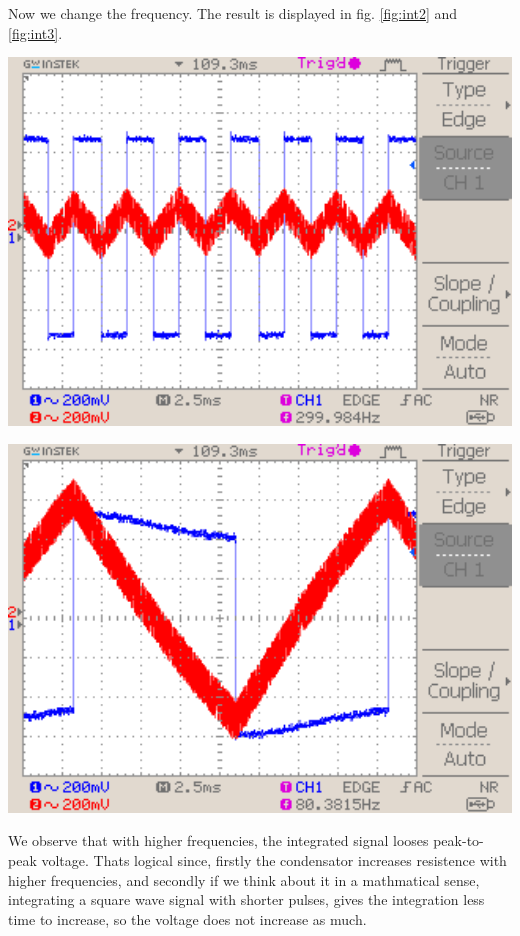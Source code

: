 \documentclass[a4paper,10pt]{article}
\newenvironment{Figure}
        {\par\medskip\noindent\minipage{\linewidth}}
        {\endminipage\par\medskip}
\numberwithin{equation}{section}
\begin{document}
\begin{multicols}{2}
	Now we change the frequency. The result is displayed in fig. \ref{fig:int2} and \ref{fig:int3}.
	\begin{Figure}
		\centering
		\includegraphics[width=1\textwidth]{../data/DS0033_n.png}
		\label{fig:int2}
	\end{Figure}
	\begin{Figure}
		\centering
		\includegraphics[width=1\textwidth]{../data/DS0034_n.png}
		\label{fig:int3}
	\end{Figure}
	We observe that with higher frequencies, the integrated signal looses peak-to-peak voltage. Thats logical since, firstly the condensator increases resistence with higher frequencies, and secondly if we think about it in a mathmatical sense, integrating a square wave signal with shorter pulses, gives the integration less time to increase, so the voltage does not increase as much.


\end{multicols}
\end{document}

